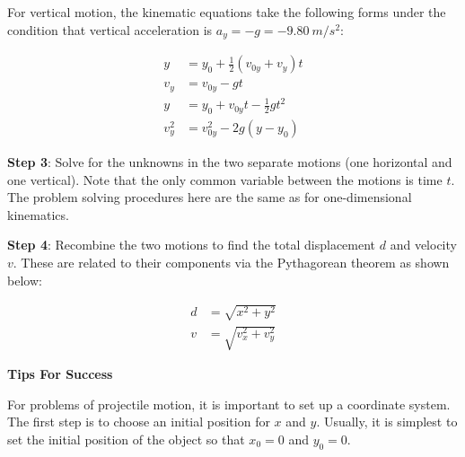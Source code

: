 \documentclass[main-physics.tex]{subfiles}
\begin{document}
For vertical motion, the kinematic equations take the following forms under the condition that vertical acceleration is $a_y = -g = \SI{-9.80}{m/s^2}$:

\begin{align}
    y &= y_0 + \frac{1}{2}\left(v_{0y} + v_y\right)t\\[0.5ex]
    v_y &= v_{0y} - gt \label{SjYaoE} \\[0.5ex]
    y &= y_0 + v_{0y}t - \frac{1}{2}  g t^2  \label{36YuvF} \\[0.5ex]
    v_y^2 &= v_{0y}^2 - 2 g (y - y_0) \label{wROSXN}
\end{align}

\vspace{1em}

\textbf{Step 3}: Solve for the unknowns in the two separate motions (one horizontal and one vertical). Note that the only common variable between the motions is time $t$. The problem solving procedures here are the same as for one-dimensional kinematics.

\vspace{1em}

\textbf{Step 4}: Recombine the two motions to find the total displacement $d$ and velocity $v$. These are related to their components via the Pythagorean theorem as shown below:

\begin{align}
    d &= \sqrt{x^2 + y^2} \label{XvIie8} \\[0.5ex]
    v &= \sqrt{v_x^2 + v_y^2} \label{glASeI}
\end{align}

\begin{mdframed}[backgroundcolor=black!10]
    \textbf{Tips For Success}
    
    \vspace{1ex}
    
    For problems of projectile motion, it is important to set up a coordinate system. The first step is to choose an initial position for $x$ and $y$. Usually, it is simplest to set the initial position of the object so that $x_0 = 0$ and $y_0 = 0$.
\end{mdframed}
\end{document}
